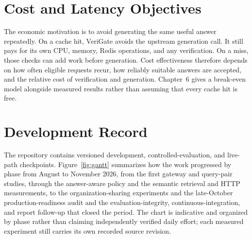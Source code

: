 \section{Cost and Latency Objectives}
The economic motivation is to avoid generating the same useful answer repeatedly. On a cache hit, VeriGate avoids the upstream generation call. It still pays for its own CPU, memory, Redis operations, and any verification. On a miss, those checks can add work before generation. Cost effectiveness therefore depends on how often eligible requests recur, how reliably suitable answers are accepted, and the relative cost of verification and generation. Chapter~6 gives a break-even model alongside measured results rather than assuming that every cache hit is free.

\section{Development Record}
The repository contains versioned development, controlled-evaluation, and live-path checkpoints. Figure~\ref{fig:gantt} summarizes how the work progressed by phase from August to November 2026, from the first gateway and query-pair studies, through the answer-aware policy and the semantic retrieval and HTTP measurements, to the organization-sharing experiments and the late-October production-readiness audit and the evaluation-integrity, continuous-integration, and report follow-up that closed the period. The chart is indicative and organized by phase rather than claiming independently verified daily effort; each measured experiment still carries its own recorded source revision.

